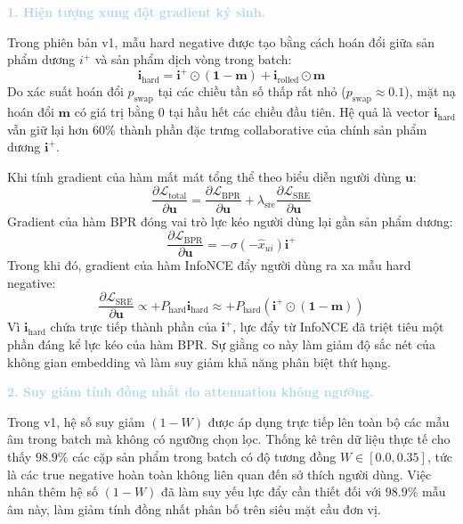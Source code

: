 \noindent\textcolor{lightblue}{\textbf{1. Hiện tượng xung đột gradient ký sinh.}}

Trong phiên bản v1, mẫu hard negative được tạo bằng cách hoán đổi giữa sản phẩm dương $i^+$ và sản phẩm dịch vòng trong batch:
\begin{equation}
\mathbf{i}_{\text{hard}} = \mathbf{i}^+ \odot (\mathbf{1} - \mathbf{m}) + \mathbf{i}_{\text{rolled}} \odot \mathbf{m}
\end{equation}
Do xác suất hoán đổi $p_{\text{swap}}$ tại các chiều tần số thấp rất nhỏ ($p_{\text{swap}} \approx 0.1$), mặt nạ hoán đổi $\mathbf{m}$ có giá trị bằng 0 tại hầu hết các chiều đầu tiên. Hệ quả là vector $\mathbf{i}_{\text{hard}}$ vẫn giữ lại hơn 60\% thành phần đặc trưng collaborative của chính sản phẩm dương $\mathbf{i}^+$.

Khi tính gradient của hàm mất mát tổng thể theo biểu diễn người dùng $\mathbf{u}$:
\begin{equation}
\frac{\partial \mathcal{L}_{\text{total}}}{\partial \mathbf{u}} = \frac{\partial \mathcal{L}_{\text{BPR}}}{\partial \mathbf{u}} + \lambda_{\text{sre}} \frac{\partial \mathcal{L}_{\text{SRE}}}{\partial \mathbf{u}}
\end{equation}
Gradient của hàm BPR đóng vai trò lực kéo người dùng lại gần sản phẩm dương:
\begin{equation}
\frac{\partial \mathcal{L}_{\text{BPR}}}{\partial \mathbf{u}} = -\sigma(-\hat{x}_{ui}) \mathbf{i}^+
\end{equation}
Trong khi đó, gradient của hàm InfoNCE đẩy người dùng ra xa mẫu hard negative:
\begin{equation}
\frac{\partial \mathcal{L}_{\text{SRE}}}{\partial \mathbf{u}} \propto + P_{\text{hard}} \mathbf{i}_{\text{hard}} \approx + P_{\text{hard}} \left( \mathbf{i}^+ \odot (\mathbf{1} - \mathbf{m}) \right)
\end{equation}
Vì $\mathbf{i}_{\text{hard}}$ chứa trực tiếp thành phần của $\mathbf{i}^+$, lực đẩy từ InfoNCE đã triệt tiêu một phần đáng kể lực kéo của hàm BPR. Sự giằng co này làm giảm độ sắc nét của không gian embedding và làm suy giảm khả năng phân biệt thứ hạng.

\noindent\textcolor{lightblue}{\textbf{2. Suy giảm tính đồng nhất do attenuation không ngưỡng.}}

Trong v1, hệ số suy giảm $(1 - W)$ được áp dụng trực tiếp lên toàn bộ các mẫu âm trong batch mà không có ngưỡng chọn lọc. Thống kê trên dữ liệu thực tế cho thấy $98.9\%$ các cặp sản phẩm trong batch có độ tương đồng $W \in [0.0, 0.35]$, tức là các true negative hoàn toàn không liên quan đến sở thích người dùng. Việc nhân thêm hệ số $(1 - W)$ đã làm suy yếu lực đẩy cần thiết đối với $98.9\%$ mẫu âm này, làm giảm tính đồng nhất phân bố trên siêu mặt cầu đơn vị.

